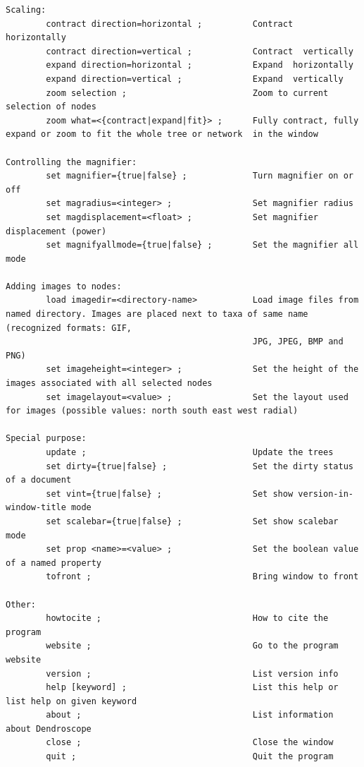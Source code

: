 \documentclass[11pt]{article}
\begin{document}
\begin{verbatim}
Scaling:
        contract direction=horizontal ;          Contract  horizontally
        contract direction=vertical ;            Contract  vertically
        expand direction=horizontal ;            Expand  horizontally
        expand direction=vertical ;              Expand  vertically
        zoom selection ;                         Zoom to current selection of nodes
        zoom what=<{contract|expand|fit}> ;      Fully contract, fully expand or zoom to fit the whole tree or network  in the window                        

Controlling the magnifier:
        set magnifier={true|false} ;             Turn magnifier on or off
        set magradius=<integer> ;                Set magnifier radius
        set magdisplacement=<float> ;            Set magnifier displacement (power)
        set magnifyallmode={true|false} ;        Set the magnifier all mode

Adding images to nodes:
        load imagedir=<directory-name>           Load image files from named directory. Images are placed next to taxa of same name (recognized formats: GIF, 
                                                 JPG, JPEG, BMP and PNG)
        set imageheight=<integer> ;              Set the height of the images associated with all selected nodes
        set imagelayout=<value> ;                Set the layout used for images (possible values: north south east west radial)

Special purpose:
        update ;                                 Update the trees
        set dirty={true|false} ;                 Set the dirty status of a document
        set vint={true|false} ;                  Set show version-in-window-title mode
        set scalebar={true|false} ;              Set show scalebar mode
        set prop <name>=<value> ;                Set the boolean value of a named property
        tofront ;                                Bring window to front

Other:
        howtocite ;                              How to cite the program
        website ;                                Go to the program website
        version ;                                List version info
        help [keyword] ;                         List this help or list help on given keyword 
        about ;                                  List information about Dendroscope
        close ;                                  Close the window
        quit ;                                   Quit the program

\end{verbatim}
\normalsize
\end{document}
